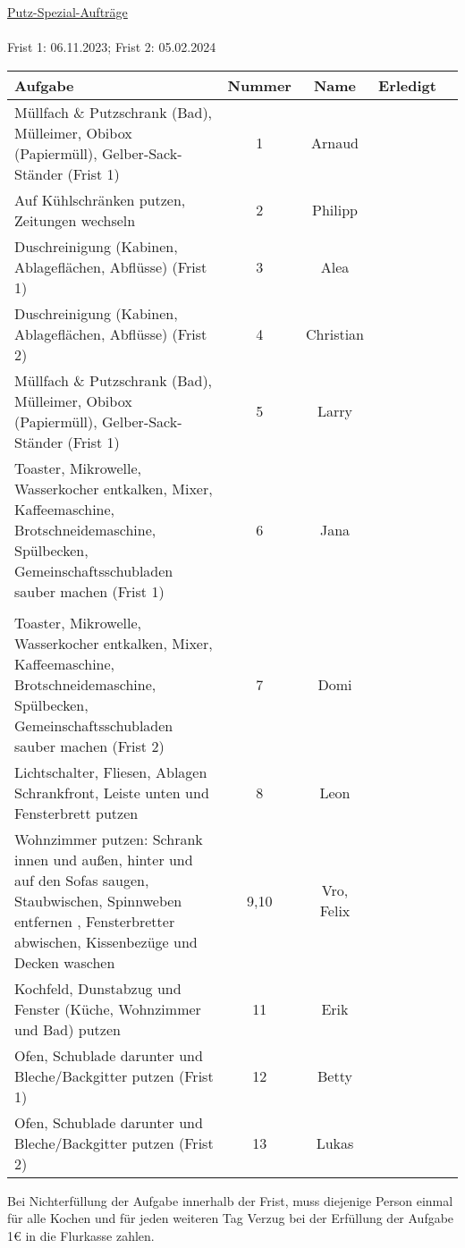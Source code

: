 \documentclass[pt14]{apa7}
\begin{document}
\pagestyle{empty}
{\Large\underline{Putz-Spezial-Aufträge} \\ \\
Frist 1: 06.11.2023; Frist 2: 05.02.2024 }
\newline

\begin{table} [htb]
	\centering
	\begin{tabular}{p{8cm}cccc}
		\hline
		\textbf{Aufgabe} & \textbf{Nummer} & \textbf{Name} & \textbf{Erledigt} \\
		\hline
		Müllfach \& Putzschrank (Bad), Mülleimer, Obibox (Papiermüll), Gelber-Sack-Ständer (Frist 1)& 1 & Arnaud  & \quad \\ [7ex] 
		\hline
		Auf Kühlschränken putzen, Zeitungen wechseln & 2 & Philipp  & \quad \\ [7ex]
		\hline
		
		Duschreinigung (Kabinen, Ablageflächen, Abflüsse) (Frist 1) & 3 & Alea  & \quad \\[7ex]
		\hline
		
		Duschreinigung (Kabinen, Ablageflächen, Abflüsse) (Frist 2) & 4 & Christian & \quad \\[7ex]
		\hline
		Müllfach \& Putzschrank (Bad), Mülleimer, Obibox (Papiermüll), Gelber-Sack-Ständer (Frist 1) & 5 & Larry  & \quad \\[7ex]
		\hline
		Toaster, Mikrowelle, Wasserkocher entkalken, Mixer, Kaffeemaschine, Brotschneidemaschine, Spülbecken, Gemeinschaftsschubladen sauber machen (Frist 1) & 6 & Jana  & \quad \\[7ex]\\
		\hline
		Toaster, Mikrowelle, Wasserkocher entkalken, Mixer, Kaffeemaschine, Brotschneidemaschine, Spülbecken, Gemeinschaftsschubladen sauber machen (Frist 2) & 7 & Domi & \quad \\[7ex]
		\hline
		 Lichtschalter, Fliesen, Ablagen Schrankfront, Leiste unten und Fensterbrett putzen & 8 & Leon & \quad \\[7ex]
		\hline
		Wohnzimmer putzen: Schrank innen und außen, hinter und auf den Sofas saugen, Staubwischen, Spinnweben entfernen , Fensterbretter abwischen, Kissenbezüge und Decken waschen & 9,10 & Vro, Felix & \quad \\ [7ex]
		\hline
		Kochfeld, Dunstabzug und Fenster (Küche, Wohnzimmer und Bad) putzen& 11 & Erik & \quad \\[7ex]
		\hline
		Ofen, Schublade darunter und Bleche/Backgitter putzen (Frist 1) & 12 & Betty & \quad \\[7ex]
		\hline
		Ofen, Schublade darunter und Bleche/Backgitter putzen (Frist 2) & 13 & Lukas & \quad \\[7ex]
		\hline
	\end{tabular}
\end{table}

Bei Nichterfüllung der Aufgabe innerhalb der Frist, muss diejenige Person einmal für alle Kochen und für jeden weiteren Tag Verzug bei der Erfüllung der Aufgabe 1€ in die Flurkasse zahlen.
\end{document}
